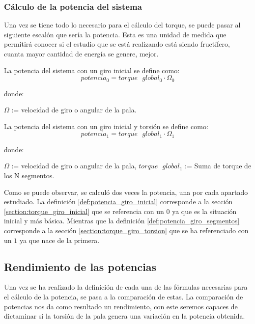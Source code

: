  
 \subsubsection{Cálculo de la potencia del sistema}
 
 Una vez se tiene todo lo necesario para el cálculo del torque, se puede pasar al siguiente escalón que sería la potencia. Esta es una unidad de medida que permitirá conocer si el estudio que se está realizando está siendo fructífero, cuanta mayor cantidad de energía se genere, mejor.
 
  \begin{definicion}
 La potencia del sistema con un giro inicial se define como:
 $$ potencia_0 = torque \text{ } global_0 \cdot \Omega_0 $$ 
 
 donde:
 
  \centering $\Omega$ := velocidad de giro o angular de la pala.
 \label{def:potencia_giro_inicial}
 \end{definicion}
 
   \begin{definicion}
 La potencia del sistema con un giro inicial y torsión se define como:
 $$ potencia_1 = torque \text{ } global_1 \cdot \Omega_1 $$ 
 
 donde:
 
  \centering $\Omega$ := velocidad de giro o angular de la pala,\hspace{7} $torque \text{ } global_1$ := Suma de torque de los N segmentos.
 \label{def:potencia_giro_segmentos}
 \end{definicion}
 
 Como se puede observar, se calculó dos veces la potencia, una por cada apartado estudiado. La definición \ref{def:potencia_giro_inicial} corresponde a la sección \ref{section:torque_giro_inicial} que se referencia con un $0$ ya que es la situación inicial y más básica. Mientras que la definición \ref{def:potencia_giro_segmentos} corresponde a la sección \ref{section:torque_giro_torsion} que se ha referenciado con un $1$ ya que nace de la primera.
 
 
 \subsection{Rendimiento de las potencias}
 \label{section:rendimiento}
 
 Una vez se ha realizado la definición de cada una de las fórmulas necesarias para el cálculo de la potencia, se pasa a la comparación de estas. La comparación de potencias nos da como resultado un rendimiento, con este seremos capaces de dictaminar si la torsión de la pala genera una variación en la potencia obtenida.
 
